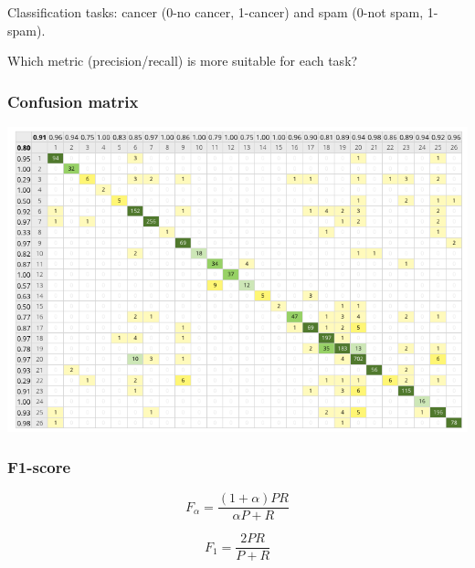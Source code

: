 \documentclass[svgnames]{beamer}
\begin{document}
\begin{frame}
Classification tasks: cancer (0-no cancer, 1-cancer) and spam (0-not spam, 1-spam).

Which metric (precision/recall) is more suitable for each task?

\end{frame}


\begin{frame}
  \frametitle{Confusion matrix}
  \includegraphics[height=.8\textheight]{confusion-matrix}
\end{frame}


\begin{frame}
  \frametitle{F1-score}
  \begin{equation}
    F_{\alpha} = \frac{(1+\alpha)PR}{\alpha P + R}
  \end{equation}

  \begin{equation}
    F_{1} = \frac{2PR}{P + R}
  \end{equation}  
\end{frame}
\end{document}
